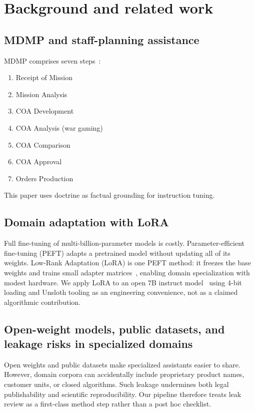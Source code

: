 \documentclass[11pt]{article}
\begin{document}
\section{Background and related work}
\label{sec:related}

\subsection{MDMP and staff-planning assistance}
\label{sec:related-mdmp}

MDMP comprises seven steps~\citep{fm50,adp50}:
\begin{enumerate}[leftmargin=*]
  \item Receipt of Mission
  \item Mission Analysis
  \item COA Development
  \item COA Analysis (war gaming)
  \item COA Comparison
  \item COA Approval
  \item Orders Production
\end{enumerate}
This paper uses doctrine as factual grounding for instruction tuning.

\subsection{Domain adaptation with LoRA}
\label{sec:related-lora}

Full fine-tuning of multi-billion-parameter models is costly.
Parameter-efficient fine-tuning (PEFT) adapts a pretrained model without
updating all of its weights.
Low-Rank Adaptation (LoRA) is one PEFT method: it freezes the base weights and
trains small adapter matrices~\citep{hu2022lora}, enabling domain specialization
with modest hardware.
We apply LoRA to an open 7B instruct model~\citep{mistral7b} using 4-bit
loading and Unsloth tooling as an engineering convenience, not as a claimed
algorithmic contribution.

\subsection{Open-weight models, public datasets, and leakage risks in specialized domains}
\label{sec:related-open}

Open weights and public datasets make specialized assistants easier to share.
However, domain corpora can accidentally include proprietary product names,
customer units, or closed algorithms.
Such leakage undermines both legal publishability and scientific
reproducibility.
Our pipeline therefore treats leak review as a first-class method step rather
than a post hoc checklist.
\end{document}
